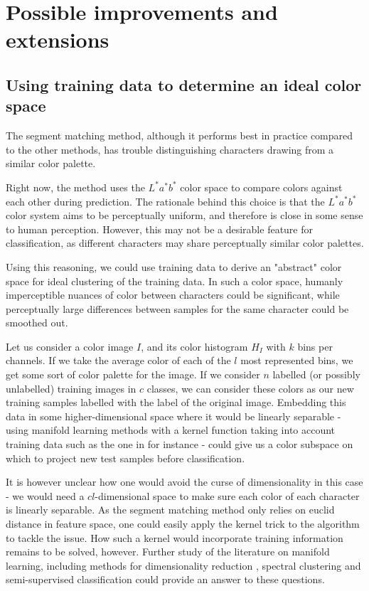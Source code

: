 \newpage
\section{Possible improvements and extensions}
\label{sec:extensions}
\subsection{Using training data to determine an ideal color space}

The segment matching method, although it performs best in practice compared to the other methods, has trouble distinguishing characters drawing from a similar color palette.

Right now, the method uses the $L^*a^*b^*$ color space to compare colors against each other during prediction. The rationale behind this choice is that the $L^*a^*b^*$ color system aims to be perceptually uniform, and therefore is close in some sense to human perception. However, this may not be a desirable feature for classification, as different characters may share perceptually similar color palettes. 

Using this reasoning, we could use training data to derive an "abstract" color space for ideal clustering of the training data. In such a color space, humanly imperceptible nuances of color between characters could be significant, while perceptually large differences between samples for the same character could be smoothed out.

Let us consider a color image $I$, and its color histogram $H_I$ with $k$ bins per channels. If we take the average color of each of the $l$ most represented bins, we get some sort of color palette for the image. If we consider $n$ labelled (or possibly unlabelled) training images in $c$ classes, we can consider these colors as our new training samples labelled with the label of the original image. Embedding this data in some higher-dimensional space where it would be linearly separable - using manifold learning methods with a kernel function taking into account training data such as the one in \cite{urahama2007semi} for instance - could give us a color subspace on which to project new test samples before classification.

It is however unclear how one would avoid the curse of dimensionality in this case - we would need a $cl$-dimensional space to make sure each color of each character is linearly separable. As the segment matching method only relies on euclid distance in feature space, one could easily apply the kernel trick to the algorithm to tackle the issue. How such a kernel would incorporate training information remains to be solved, however. Further study of the literature on manifold learning, including methods for dimensionality reduction \cite{roweis2000nonlinear}
\cite{belkin2003laplacian}
\cite{saul2006spectral}, spectral clustering \cite{shi2000normalized}
\cite{grady2006isoperimetric}
\cite{ng2002spectral}
\cite{meila2001random} and semi-supervised classification \cite{urahama2007semi} could provide an answer to these questions.


